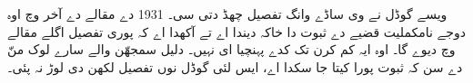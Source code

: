 \documentclass[../../../include/open-logic-section]{subfiles}
\begin{document}
\begin{digress}
ویسے گوڈل نے وی ساڈے وانگ تفصیل چھڈ دتی سی۔ 1931 دے
مقالے دے آخر وچ اوہ دوجے نامکملیت قضیے دے ثبوت دا خاکہ
دیندا اے تے آکھدا اے کہ پوری تفصیل اگلے مقالے وچ دیوے گا۔
اوہ ایہ کم کرن تک کدے پہنچیا ای نہیں۔ دلیل سمجھّن والے
سارے لوک منّ دے سن کہ ثبوت پورا کیتا جا سکدا اے، ایس لئی
گوڈل نوں تفصیل لکھن دی لوڑ نہ پئی۔
\end{digress}
\end{document}
